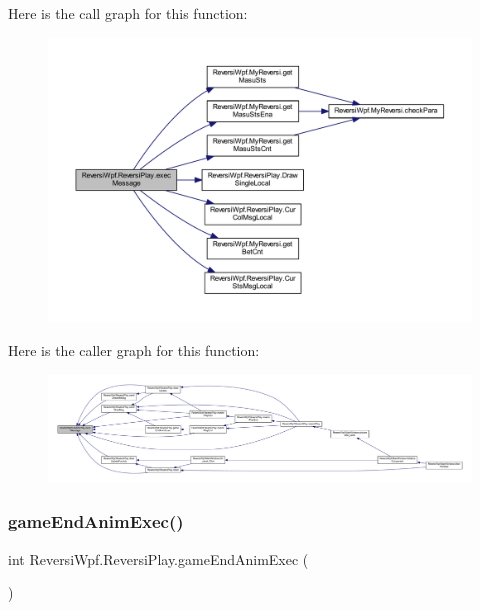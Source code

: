 Here is the call graph for this function\+:\nopagebreak
\begin{figure}[H]
\begin{center}
\leavevmode
\includegraphics[width=350pt]{class_reversi_wpf_1_1_reversi_play_aa9c1ae9fc1af06e7e73f9db980cf0cfa_cgraph}
\end{center}
\end{figure}
Here is the caller graph for this function\+:
\nopagebreak
\begin{figure}[H]
\begin{center}
\leavevmode
\includegraphics[width=350pt]{class_reversi_wpf_1_1_reversi_play_aa9c1ae9fc1af06e7e73f9db980cf0cfa_icgraph}
\end{center}
\end{figure}
\mbox{\label{class_reversi_wpf_1_1_reversi_play_a222edc5a1161d4859635ef87d46da59c}} 
\subsubsection{\texorpdfstring{game\+End\+Anim\+Exec()}{gameEndAnimExec()}}
{\footnotesize\ttfamily int Reversi\+Wpf.\+Reversi\+Play.\+game\+End\+Anim\+Exec (\begin{DoxyParamCaption}{ }\end{DoxyParamCaption})}



